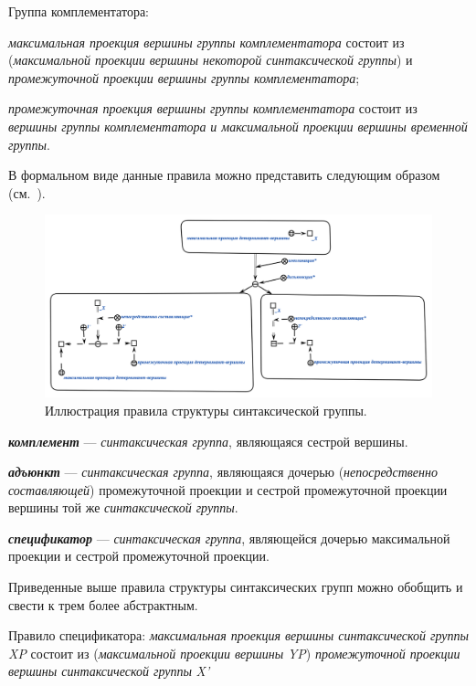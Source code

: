 Группа комплементатора:
\begin{textitemize}
    \item \textit{максимальная проекция вершины группы комплементатора} состоит из (\textit{максимальной проекции вершины некоторой синтаксической группы}) и \textit{промежуточной проекции вершины группы комплементатора};
    \item \textit{промежуточная проекция вершины группы комплементатора} состоит из \textit{вершины группы комплементатора} \textit{и максимальной проекции вершины временной группы}.
\end{textitemize}

В формальном виде данные правила можно представить следующим образом (см.~\textit{}).

\begin{figure}[h]
    \centering
    \includegraphics[scale=0.8]{images/part2/chapter_lang/tree_structure_rule}
    \caption{Иллюстрация правила структуры синтаксической группы.}
    \label{fig:pic_tree_structure_rule}
\end{figure}

\textbf{\textit{комплемент}} --- \textit{синтаксическая группа}, являющаяся сестрой вершины.

\textbf{\textit{адъюнкт}} --- \textit{синтаксическая группа}, являющаяся дочерью (\textit{непосредственно составляющей}) промежуточной проекции и сестрой промежуточной проекции вершины той же \textit{синтаксической группы}.

\textbf{\textit{спецификатор}} --- \textit{синтаксическая группа}, являющейся дочерью максимальной проекции и сестрой промежуточной проекции.

Приведенные выше правила структуры синтаксических групп можно обобщить и свести к трем более абстрактным.

Правило спецификатора: \textit{максимальная проекция вершины синтаксической группы} \textit{XP} состоит из (\textit{максимальной проекции вершины} \textit{YP}) \textit{промежуточной проекции вершины синтаксической группы} \textit{X'}

